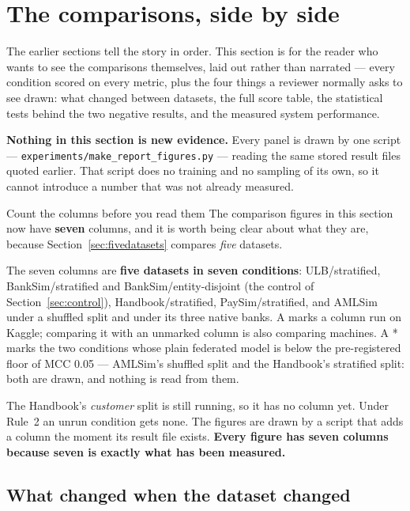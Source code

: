 \documentclass[11pt]{article}
\begin{document}
\section{The comparisons, side by side}
\label{sec:comparisons}

The earlier sections tell the story in order. This section is for the reader who wants to see the
comparisons themselves, laid out rather than narrated --- every condition scored on every metric, plus
the four things a reviewer normally asks to see drawn: what changed between datasets, the full score
table, the statistical tests behind the two negative results, and the measured system performance.

\textbf{Nothing in this section is new evidence.} Every panel is drawn by one script ---
\texttt{experiments/\allowbreak make\_\allowbreak report\_\allowbreak figures.py} --- reading the same
stored result files quoted earlier. That
script does no training and no sampling of its own, so it cannot introduce a number that was not already
measured.

\begin{keybox}{Count the columns before you read them}
The comparison figures in this section now have \textbf{seven} columns, and it is worth being clear about
what they are, because Section~\ref{sec:fivedatasets} compares \emph{five} datasets.

The seven columns are \textbf{five datasets in seven conditions}: ULB/stratified, BankSim/stratified and
BankSim/entity-disjoint (the control of Section~\ref{sec:control}), Handbook/stratified, PaySim/stratified,
and AMLSim under a shuffled split and under its three native banks. A \dag{} marks a column run on Kaggle;
comparing it with an unmarked column is also comparing machines. A * marks the two conditions whose plain
federated model is below the pre-registered floor of MCC 0.05 --- AMLSim's shuffled split and the
Handbook's stratified split: both are drawn, and nothing is read from them.

The Handbook's \emph{customer} split is still running, so it has no column yet. Under Rule~2 an unrun
condition gets none. The figures are drawn by a script that adds a column the moment its result file
exists. \textbf{Every figure has seven columns because seven is exactly what has been measured.}
\end{keybox}

\subsection{What changed when the dataset changed}
\end{document}
